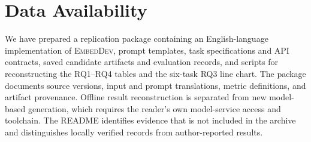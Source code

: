 \section*{Data Availability}
We have prepared a replication package containing an English-language implementation of \textsc{EmbedDev}, prompt templates, task specifications and API contracts, saved candidate artifacts and evaluation records, and scripts for reconstructing the RQ1--RQ4 tables and the six-task RQ3 line chart.
The package documents source versions, input and prompt translations, metric definitions, and artifact provenance.
Offline result reconstruction is separated from new model-based generation, which requires the reader's own model-service access and toolchain.
The README identifies evidence that is not included in the archive and distinguishes locally verified records from author-reported results.
